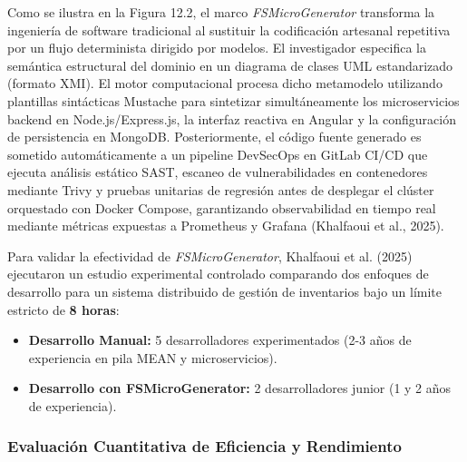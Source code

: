 Como se ilustra en la Figura 12.2, el marco \textit{FSMicroGenerator} transforma la ingeniería de software tradicional al sustituir la codificación artesanal repetitiva por un flujo determinista dirigido por modelos. El investigador especifica la semántica estructural del dominio en un diagrama de clases UML estandarizado (formato XMI). El motor computacional procesa dicho metamodelo utilizando plantillas sintácticas Mustache para sintetizar simultáneamente los microservicios backend en Node.js/Express.js, la interfaz reactiva en Angular y la configuración de persistencia en MongoDB. Posteriormente, el código fuente generado es sometido automáticamente a un pipeline DevSecOps en GitLab CI/CD que ejecuta análisis estático SAST, escaneo de vulnerabilidades en contenedores mediante Trivy y pruebas unitarias de regresión antes de desplegar el clúster orquestado con Docker Compose, garantizando observabilidad en tiempo real mediante métricas expuestas a Prometheus y Grafana (Khalfaoui et al., 2025).


Para validar la efectividad de \textit{FSMicroGenerator}, Khalfaoui et al. (2025) ejecutaron un estudio experimental controlado comparando dos enfoques de desarrollo para un sistema distribuido de gestión de inventarios bajo un límite estricto de \textbf{8 horas}: %
\begin{itemize}
    \item \textbf{Desarrollo Manual:} 5 desarrolladores experimentados (2-3 años de experiencia en pila MEAN y microservicios). %
    \item \textbf{Desarrollo con FSMicroGenerator:} 2 desarrolladores junior (1 y 2 años de experiencia). %
\end{itemize}

\vspace{0.5cm}

\subsubsection{Evaluación Cuantitativa de Eficiencia y Rendimiento}

